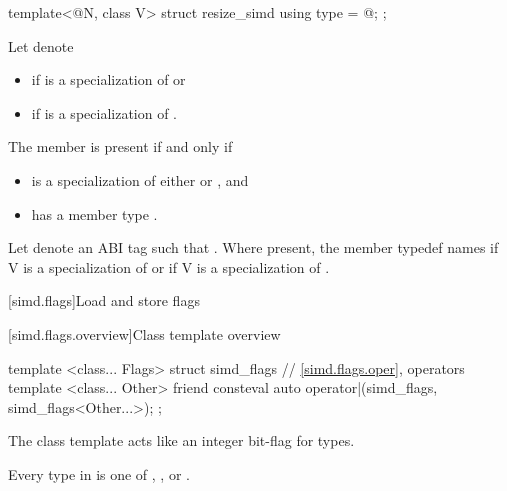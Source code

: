 \begin{itemdecl}
template<@\simdsizetype@ N, class V> struct resize_simd { using type = @\seebelow@; };
\end{itemdecl}

\begin{itemdescr}
  \pnum Let  denote
  \begin{itemize}
    \item {} if  is a specialization of
       or
    \item {} if  is a
      specialization of .
  \end{itemize}

  \pnum
  The member  is present if and only if
  \begin{itemize}
    \item {} is a specialization of either  or
      , and
    \item {} has a member type .
  \end{itemize}

  \pnum
  Let  denote an ABI tag such that .
  Where present, the member typedef  names  if \tcode V is a specialization of  or
   if \tcode V is a specialization of
  .
\end{itemdescr}

[simd.flags]{Load and store flags}

[simd.flags.overview]{Class template  overview}

\begin{codeblock}
template <class... Flags> struct simd_flags {
  // \ref{simd.flags.oper},  operators
  template <class... Other>
    friend consteval auto operator|(simd_flags, simd_flags<Other...>);
};
\end{codeblock}

\pnum
\begin{note}
The class template  acts like an integer bit-flag for types.
\end{note}

\pnum\constraints
Every type in  is one of \tcode{\convertflag},
\tcode{\alignedflag}, or .

